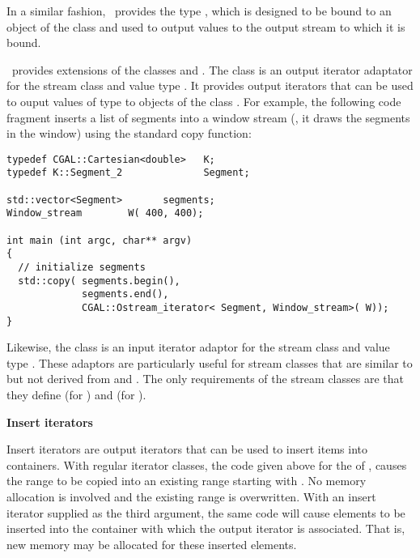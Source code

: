 In a similar fashion, \stl\ provides the type , 
which is designed to be bound to an object of the class   
and used to output values to the output stream to which it is bound.

\cgal\ provides extensions of the classes 
and . The class  
is an output iterator adaptator for the stream class  and value 
type .  It provides output iterators that can be used to ouput values 
of type  to objects of the class .
For example, the following code fragment inserts a list of segments into
a window stream (\ie, it draws the segments in the window) using the 
standard copy function: 

\begin{verbatim}
typedef CGAL::Cartesian<double>   K;
typedef K::Segment_2              Segment;

std::vector<Segment>       segments;
Window_stream        W( 400, 400);

int main (int argc, char** argv)
{
  // initialize segments
  std::copy( segments.begin(),
             segments.end(),
             CGAL::Ostream_iterator< Segment, Window_stream>( W));
}
\end{verbatim}


Likewise, the class  is an input
iterator adaptor for the stream class  and value type . 
These adaptors are particularly useful for stream classes that are similar to
but not derived from  and . The only 
requirements of the stream classes are that they define   
(for ) and  
(for ).

{\bf Insert iterators}

Insert iterators are output iterators that can be used to insert items 
into containers.
With regular iterator classes, the code given above
for the  of \stl, 
causes the range \ccc{[first,last)} to be copied into an existing range 
starting with . No memory allocation is involved and the
existing range is overwritten. With an 
insert iterator supplied as the third argument, the same code will 
cause elements to be inserted into the container with which the output
iterator is associated.  That is, new memory may be allocated for these
inserted elements.

